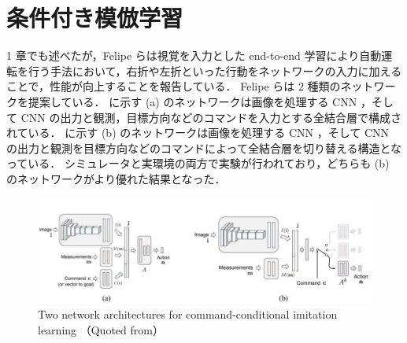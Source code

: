 \section{条件付き模倣学習}
1 章でも述べたが，Felipe ら\cite{codevilla2018endtoend}は視覚を入力とした end-to-end 学習により自動運転を行う手法において，右折や左折といった行動をネットワークの入力に加えることで，性能が向上することを報告している．
Felipe らは 2 種類のネットワークを提案している．
に示す (a) のネットワークは画像を処理する CNN ，そして CNN の出力と観測，目標方向などのコマンドを入力とする全結合層で構成されている．
に示す (b) のネットワークは画像を処理する CNN ，そして CNN の出力と観測を目標方向などのコマンドによって全結合層を切り替える構造となっている．
シミュレータと実環境の両方で実験が行われており，どちらも (b) のネットワークがより優れた結果となった．

\begin{figure}[htbp]
  \centering
  \includegraphics[width=140mm]{images/pdf/other/branched.pdf}
  \caption[Two network architectures for command-conditional imitation learning]{Two network architectures for command-conditional imitation learning 
  \protect\linebreak （Quoted from\cite{codevilla2018endtoend}）}
  \label{fig:felipe_branched}
\end{figure}

\clearpage